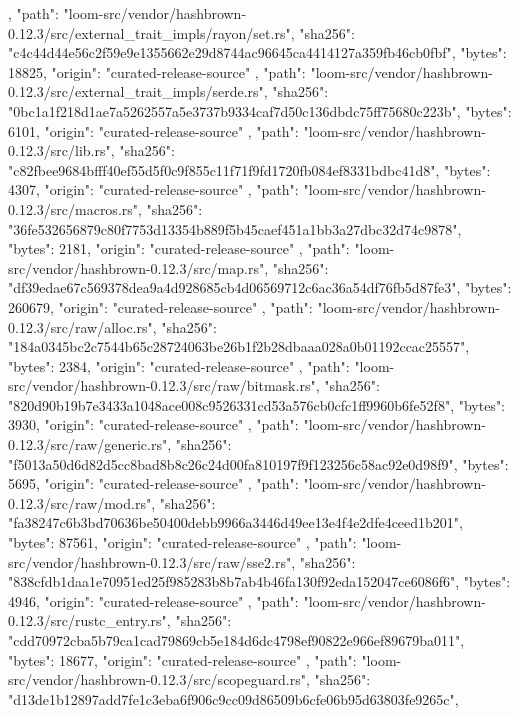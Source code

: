 {{    },
    {
      "path": "loom-src/vendor/hashbrown-0.12.3/src/external_trait_impls/rayon/set.rs",
      "sha256": "c4c44d44e56c2f59e9e1355662e29d8744ac96645ca4414127a359fb46cb0fbf",
      "bytes": 18825,
      "origin": "curated-release-source"
    },
    {
      "path": "loom-src/vendor/hashbrown-0.12.3/src/external_trait_impls/serde.rs",
      "sha256": "0bc1a1f218d1ae7a5262557a5e3737b9334caf7d50c136dbdc75ff75680c223b",
      "bytes": 6101,
      "origin": "curated-release-source"
    },
    {
      "path": "loom-src/vendor/hashbrown-0.12.3/src/lib.rs",
      "sha256": "c82fbee9684bfff40ef55d5f0c9f855c11f71f9fd1720fb084ef8331bdbc41d8",
      "bytes": 4307,
      "origin": "curated-release-source"
    },
    {
      "path": "loom-src/vendor/hashbrown-0.12.3/src/macros.rs",
      "sha256": "36fe532656879c80f7753d13354b889f5b45caef451a1bb3a27dbc32d74c9878",
      "bytes": 2181,
      "origin": "curated-release-source"
    },
    {
      "path": "loom-src/vendor/hashbrown-0.12.3/src/map.rs",
      "sha256": "df39edae67c569378dea9a4d928685cb4d06569712c6ac36a54df76fb5d87fe3",
      "bytes": 260679,
      "origin": "curated-release-source"
    },
    {
      "path": "loom-src/vendor/hashbrown-0.12.3/src/raw/alloc.rs",
      "sha256": "184a0345bc2c7544b65c28724063be26b1f2b28dbaaa028a0b01192ccac25557",
      "bytes": 2384,
      "origin": "curated-release-source"
    },
    {
      "path": "loom-src/vendor/hashbrown-0.12.3/src/raw/bitmask.rs",
      "sha256": "820d90b19b7e3433a1048ace008c9526331cd53a576cb0cfc1ff9960b6fe52f8",
      "bytes": 3930,
      "origin": "curated-release-source"
    },
    {
      "path": "loom-src/vendor/hashbrown-0.12.3/src/raw/generic.rs",
      "sha256": "f5013a50d6d82d5cc8bad8b8c26c24d00fa810197f9f123256c58ac92e0d98f9",
      "bytes": 5695,
      "origin": "curated-release-source"
    },
    {
      "path": "loom-src/vendor/hashbrown-0.12.3/src/raw/mod.rs",
      "sha256": "fa38247c6b3bd70636be50400debb9966a3446d49ee13e4f4e2dfe4ceed1b201",
      "bytes": 87561,
      "origin": "curated-release-source"
    },
    {
      "path": "loom-src/vendor/hashbrown-0.12.3/src/raw/sse2.rs",
      "sha256": "838cfdb1daa1e70951ed25f985283b8b7ab4b46fa130f92eda152047ce6086f6",
      "bytes": 4946,
      "origin": "curated-release-source"
    },
    {
      "path": "loom-src/vendor/hashbrown-0.12.3/src/rustc_entry.rs",
      "sha256": "cdd70972cba5b79ca1cad79869cb5e184d6dc4798ef90822e966ef89679ba011",
      "bytes": 18677,
      "origin": "curated-release-source"
    },
    {
      "path": "loom-src/vendor/hashbrown-0.12.3/src/scopeguard.rs",
      "sha256": "d13de1b12897add7fe1c3eba6f906c9cc09d86509b6cfe06b95d63803fe9265c",
}}
